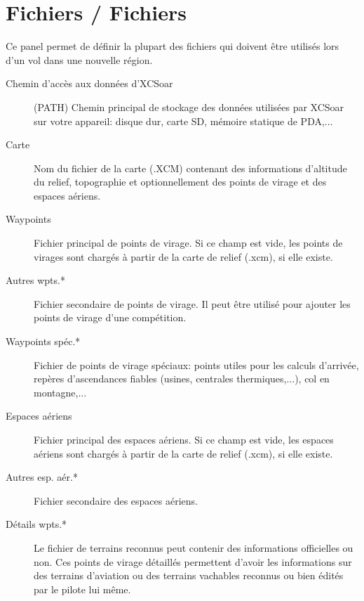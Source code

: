 \section{Fichiers / Fichiers}
Ce panel permet de définir la plupart des fichiers qui doivent être utilisés lors d'un vol dans une nouvelle région.

\begin{description}
\item[Chemin d'accès aux données d'XCSoar]  (PATH) Chemin principal de stockage des données utilisées par XCSoar sur votre appareil: disque dur, carte SD, mémoire statique de PDA,...
\item[Carte]  Nom du fichier de la carte (.XCM) contenant des informations d'altitude du relief, topographie et optionnellement des points de virage et des espaces aériens.
\item[Waypoints]  Fichier principal de points de virage. Si ce champ est vide, les points de virages sont chargés à partir de la carte de relief (.xcm), si elle existe.
\item[Autres wpts.*]  Fichier secondaire de points de virage. Il peut être utilisé pour ajouter les points de virage d'une compétition.
\item[Waypoints spéc.*]  Fichier de points de virage spéciaux: points utiles pour les calculs d'arrivée, repères d'ascendances fiables (usines, centrales thermiques,...), col en montagne,...
\item[Espaces aériens] Fichier principal des espaces aériens. Si ce champ est vide, les espaces aériens sont chargés à partir de la carte de relief (.xcm), si elle existe.
\item[Autres esp. aér.*]  Fichier secondaire des espaces aériens.
\item[Détails wpts.*]  Le fichier de terrains reconnus peut contenir des informations officielles ou non. Ces points de virage détaillés permettent d'avoir les informations sur des terrains d'aviation ou des terrains vachables reconnus ou bien édités par le pilote lui même.
\end{description}

